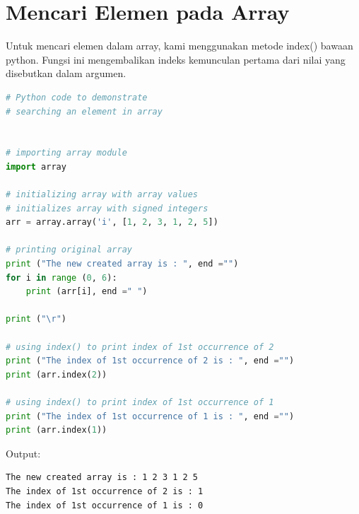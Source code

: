 \section{Mencari Elemen pada Array}

Untuk mencari elemen dalam array, kami menggunakan metode index() bawaan python. Fungsi ini mengembalikan indeks kemunculan pertama dari nilai yang disebutkan dalam argumen.

\begin{lstlisting}[language=python, caption=Mencari Elemen Array]
# Python code to demonstrate
# searching an element in array


# importing array module
import array

# initializing array with array values
# initializes array with signed integers
arr = array.array('i', [1, 2, 3, 1, 2, 5])

# printing original array
print ("The new created array is : ", end ="")
for i in range (0, 6):
	print (arr[i], end =" ")

print ("\r")

# using index() to print index of 1st occurrence of 2
print ("The index of 1st occurrence of 2 is : ", end ="")
print (arr.index(2))

# using index() to print index of 1st occurrence of 1
print ("The index of 1st occurrence of 1 is : ", end ="")
print (arr.index(1))
\end{lstlisting}

Output:

\begin{lstlisting}
The new created array is : 1 2 3 1 2 5 
The index of 1st occurrence of 2 is : 1
The index of 1st occurrence of 1 is : 0
\end{lstlisting}